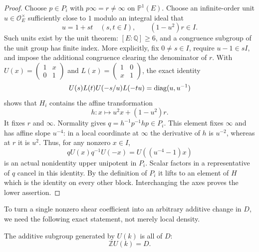 \begin{proof}
Choose $p\in P_i$ with $p\infty=r\ne\infty$ on $\mathbb P^1(E)$.
Choose an infinite-order unit $u\in\mathcal O_E^\times$ sufficiently
close to $1$ modulo an integral ideal that
\[
 u=1+st\quad(s,t\in I),\qquad (1-u^2)r\in I.
\]
Such units exist by the unit theorem: $[E:\mathbb Q]\ge6$, and a
congruence subgroup of the unit group has finite index. More explicitly,
fix $0\ne s\in I$, require $u-1\in sI$, and impose the additional
congruence clearing the denominator of $r$. With
$U(x)=\left(\begin{smallmatrix}1&x\\0&1\end{smallmatrix}\right)$
and $L(x)=\left(\begin{smallmatrix}1&0\\x&1\end{smallmatrix}\right)$,
the exact identity
\[
 U(s)L(t)U(-s/u)L(-tu)=\operatorname{diag}(u,u^{-1})
\]
shows that $H_i$ contains the affine transformation
\[
 h:x\longmapsto u^2x+(1-u^2)r.
\]
It fixes $r$ and $\infty$. Normality gives
$q=h^{-1}p^{-1}hp\in P_i$. This element fixes $\infty$ and has affine
slope $u^{-4}$: in a local coordinate at $\infty$ the derivative of
$h$ is $u^{-2}$, whereas at $r$ it is $u^2$.
Thus, for any nonzero $x\in I$,
\[
 qU(x)q^{-1}U(-x)=U((u^{-4}-1)x)
\]
is an actual nonidentity upper unipotent in $P_i$. Scalar factors in
a representative of $q$ cancel in this identity. By the definition of
$P_i$ it lifts to an element of $H$ which is the identity on every
other block. Interchanging the axes proves the lower assertion.
\end{proof}

To turn a single nonzero shear coefficient into an arbitrary additive
change in $D$, we need the following exact statement, not merely local
density.

\begin{lemma}\label{lem:chars-additive-span}
The additive subgroup generated by $U(k)$ is all of $D$:
\[
 \mathbb Z U(k)=D.
\]
\end{lemma}

